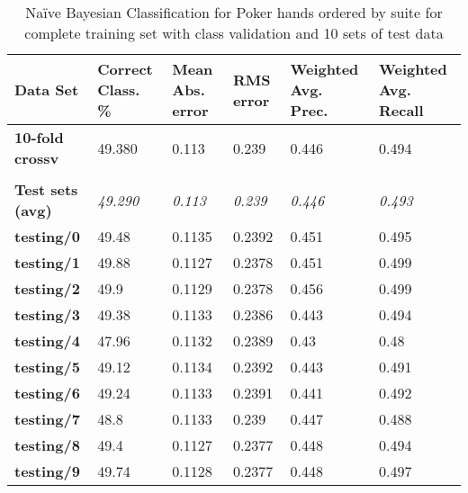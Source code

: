 \documentclass[10pt, a4paper]{article}
\begin{document}
\begin{table}[htbp]
  \centering
  \begin{tabular}{p{3cm}p{1.5cm}p{1.5cm}p{1.5cm}p{1.5cm}p{1.5cm}}
    \toprule
    \textbf{Data Set} & Correct Class. \% & Mean Abs. error & RMS error & Weighted Avg. Prec. & Weighted Avg. Recall \\
    \midrule
    \textbf{10-fold crossv} & 49.380 & 0.113 & 0.239 & 0.446 & 0.494 \\
    \textbf{} &       &       &       &       &  \\
    \textbf{Test sets (avg)} & \textit{49.290} & \textit{0.113} & \textit{0.239} & \textit{0.446} & \textit{0.493} \\
    \textbf{   testing/0} & 49.48 & 0.1135 & 0.2392 & 0.451 & 0.495 \\
    \textbf{   testing/1} & 49.88 & 0.1127 & 0.2378 & 0.451 & 0.499 \\
    \textbf{   testing/2} & 49.9  & 0.1129 & 0.2378 & 0.456 & 0.499 \\
    \textbf{   testing/3} & 49.38 & 0.1133 & 0.2386 & 0.443 & 0.494 \\
    \textbf{   testing/4} & 47.96 & 0.1132 & 0.2389 & 0.43  & 0.48 \\
    \textbf{   testing/5} & 49.12 & 0.1134 & 0.2392 & 0.443 & 0.491 \\
    \textbf{   testing/6} & 49.24 & 0.1133 & 0.2391 & 0.441 & 0.492 \\
    \textbf{   testing/7} & 48.8  & 0.1133 & 0.239 & 0.447 & 0.488 \\
    \textbf{   testing/8} & 49.4  & 0.1127 & 0.2377 & 0.448 & 0.494 \\
    \textbf{   testing/9} & 49.74 & 0.1128 & 0.2377 & 0.448 & 0.497 \\
    \bottomrule
    \end{tabular}%

	\caption{Na\"ive Bayesian Classification for Poker hands ordered by suite for complete training set with class validation and 10 sets of test data}   
  \label{tab:nnosresults}%
\end{table}%
\end{document}
